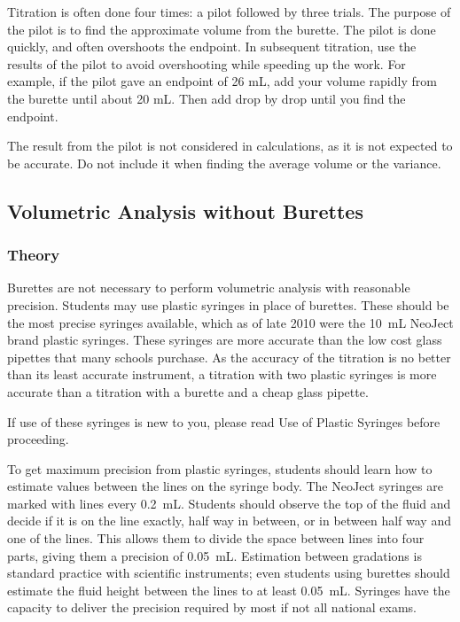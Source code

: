 Titration is often done four times: a pilot followed by three trials. The purpose of the pilot is to find the approximate volume from the burette. The pilot is done quickly, and often overshoots the endpoint. In subsequent titration, use the results of the pilot to avoid overshooting while speeding up the work. For example, if the pilot gave an endpoint of 26 mL, add your volume rapidly from the burette until about 20 mL. Then add drop by drop until you find the endpoint.

The result from the pilot is not considered in calculations, as it is not expected to be accurate. Do not include it when finding the average volume or the variance.

\subsection{Volumetric Analysis without Burettes}

\subsubsection{Theory}

Burettes are not necessary to perform volumetric analysis with reasonable precision. Students may use plastic syringes in place of burettes. These should be the most precise syringes available, which as of late 2010 were the 10~mL NeoJect brand plastic syringes. These syringes are more accurate than the low cost glass pipettes that many schools purchase. As the accuracy of the titration is no better than its least accurate instrument, a titration with two plastic syringes is more accurate than a titration with a burette and a cheap glass pipette.

If use of these syringes is new to you, please read Use of Plastic Syringes before proceeding.

To get maximum precision from plastic syringes, students should learn how to estimate values between the lines on the syringe body. The NeoJect syringes are marked with lines every 0.2~mL. Students should observe the top of the fluid and decide if it is on the line exactly, half way in between, or in between half way and one of the lines. This allows them to divide the space between lines into four parts, giving them a precision of 0.05~mL. Estimation between gradations is standard practice with scientific instruments; even students using burettes should estimate the fluid height between the lines to at least 0.05~mL. Syringes have the capacity to deliver the precision required by most if not all  national exams.

